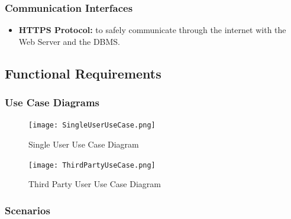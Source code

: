 \documentclass[titlepage]{article}
\begin{document}
		\subsubsection{Communication Interfaces}
		\begin{itemize}
			\item {\bf HTTPS Protocol:} to safely communicate through the internet with the Web Server and the DBMS.

		\end{itemize}

	\subsection{Functional Requirements}
			
		\subsubsection{Use Case Diagrams}
			
		\begin{figure}[ht]
  			\texttt{[image: SingleUserUseCase.png]}
  			\caption{Single User Use Case Diagram}
 			 \label{fig:SingleUserUseCase}
		\end{figure}
			
		\begin{figure}[ht]
  			\texttt{[image: ThirdPartyUseCase.png]}
  			\caption{Third Party User Use Case Diagram}
 			 \label{fig:ThirdPartyUseCase}
		\end{figure}

		\subsubsection{Scenarios}
			
\end{document}
